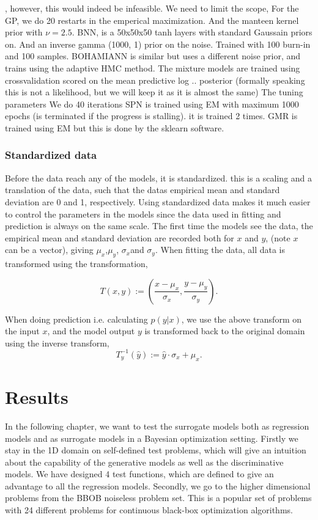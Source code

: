 , however, this would indeed be infeasible. We need to limit the scope, 
For the GP, we do 20 restarts in the emperical maximization. And the manteen kernel prior
with $\nu = 2.5$. 
BNN, is a 50x50x50 tanh layers with standard Gaussain priors on. And an inverse gamma (1000, 1)
prior on the noise. Trained with 100 burn-in and 100 samples. 
BOHAMIANN is similar but uses a different noise prior, and trains using the adaptive HMC method. 
The mixture models are trained using crossvalidation scored on the mean predictive log .. posterior
(formally speaking this is not a likelihood, but we will keep it as it is almost the same)
The tuning parameters 
We do 40 iterations 
SPN is trained using EM with maximum 1000 epochs (is terminated if the progress is stalling). 
it is trained 2 times. 
GMR is trained using EM but this is done by the sklearn software. 

\subsection{Standardized data}
Before the data reach any of the models, it is standardized. this is a scaling and a translation
of the data, such that the datas empirical mean and standard deviation are 0 and 1,
respectively. Using standardized data makes it much easier to control the parameters in the models
since the data used in fitting and prediction is always on the same scale. The first time the models
see the data, the empirical mean and standard deviation are recorded both for $x$ and $y$, (note $x$
can be a vector), giving $\mu_x$,$\mu_y$, $\sigma_x$and $\sigma_y$. When fitting the data, all data
is transformed using the transformation, 

$$T(x,y) := \left(\frac{x-\mu_x}{\sigma_x}, \frac{y-\mu_y}{\sigma_y} \right).$$

When doing prediction i.e. calculating $p(y|x)$, we use the above transform on the input $x$, and
the model output $y$ is transformed back to the original domain using the inverse transform, 
$$T^{-1}_y(\hat y) :=\hat y \cdot \sigma_x+\mu_x.$$

 \chapter{Results}
 In the following chapter, we want to test the surrogate models both as regression models and as surrogate
 models in a Bayesian optimization setting. Firstly we stay in the 1D domain on self-defined test problems, 
 which will give an intuition about the capability of the generative models as well as the discriminative models. 
We have designed 4 test functions, which are defined to give an advantage to all the regression models. Secondly, 
we go to the higher dimensional problems from the BBOB noiseless problem set. This is a popular set of problems 
with 24 different problems for continuous black-box optimization algorithms.


